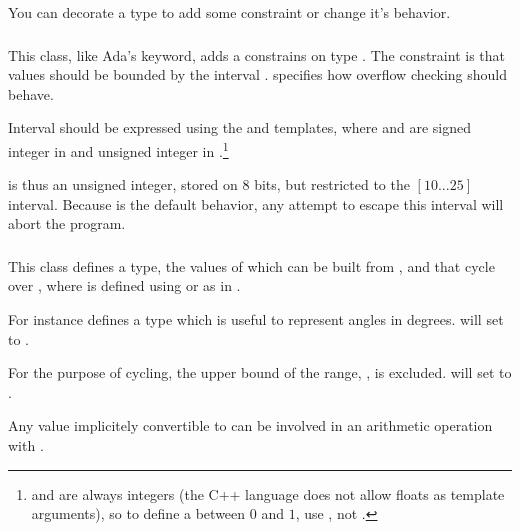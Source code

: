 You can decorate a type to add some constraint or change it's
behavior.

\subsubsection{}

This class, like Ada's  keyword, adds a constrains on type
.  The constraint is that values should be bounded by
the interval .   specifies how overflow
checking should behave.

Interval should be expressed using the  and
 templates, where  and  are
signed integer in  and unsigned integer in
.\footnote{%
   and  are always integers (the C++ language does
not allow floats as template arguments), so to define a 
between $0$ and $1$, use , not
. }%


 is thus an unsigned integer,
stored on 8 bits, but restricted to the $[10...25]$ interval.  Because
 is the default behavior, any attempt to escape this
interval will abort the program.


\subsubsection{}

This class defines a type, the values of which can be built from
, and that cycle over , where  is
defined using  or 
as in .

For instance 
defines a type which is useful to represent angles in degrees.
 will set  to .

For the purpose of cycling, the upper bound of the range, ,
is excluded.   will set  to .

Any value implicitely convertible to  can be involved in an
arithmetic operation with .

